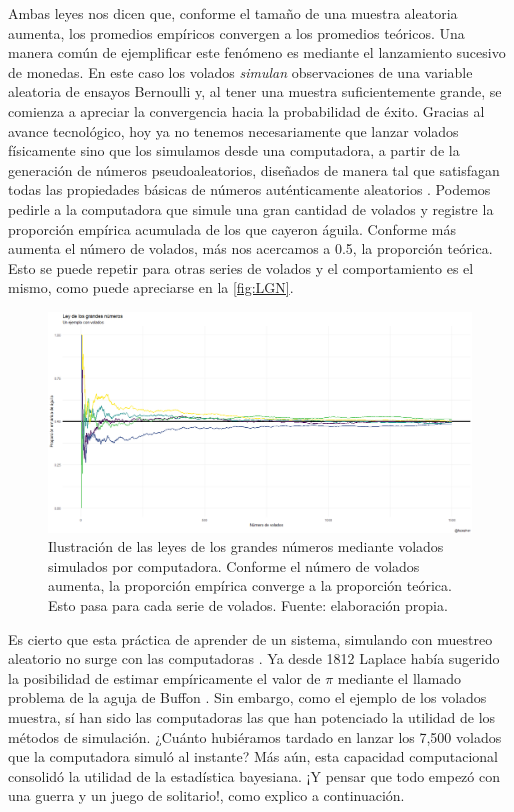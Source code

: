 Ambas leyes nos dicen que, conforme el tamaño de una muestra aleatoria aumenta, los promedios empíricos convergen a los promedios teóricos. Una manera común de ejemplificar este fenómeno es mediante el lanzamiento sucesivo de monedas. En este caso los volados \textit{simulan} observaciones de una variable aleatoria de ensayos Bernoulli y, al tener una muestra suficientemente grande, se comienza a apreciar la convergencia hacia la probabilidad de éxito. Gracias al avance tecnológico, hoy ya no tenemos necesariamente que lanzar volados físicamente sino que los simulamos desde una computadora, a partir de la generación de números pseudoaleatorios, diseñados de manera tal que satisfagan todas las propiedades básicas de números auténticamente aleatorios \parencite{Ross13}. Podemos pedirle a la computadora que simule una gran cantidad de volados y registre la proporción empírica acumulada de los que cayeron águila. Conforme más aumenta el número de volados, más nos acercamos a 0.5, la proporción teórica. Esto se puede repetir para otras series de volados y el comportamiento es el mismo, como puede apreciarse en la \ref{fig:LGN}. \\

\begin{figure}[h]
	\centering
	\includegraphics[scale=0.25]{Figs/LGN}
	\caption{Ilustración de las leyes de los grandes números mediante volados simulados por computadora. Conforme el número de volados aumenta, la proporción empírica converge a la proporción teórica. Esto pasa para cada serie de volados. Fuente: elaboración propia.}
	\label{fig:Regimen_Semipresidencial_VRepFr}	
\end{figure}

Es cierto que esta práctica de aprender de un sistema, simulando con muestreo aleatorio no surge con las computadoras \parencite{Owen13}. Ya desde 1812 Laplace había sugerido la posibilidad de estimar empíricamente el valor de $\pi$ mediante el llamado problema de la aguja de Buffon \parencite{Ragheb13}. Sin embargo, como el ejemplo de los volados muestra, sí han sido las computadoras las que han potenciado la utilidad de los métodos de simulación. ¿Cuánto hubiéramos tardado en lanzar los 7,500 volados que la computadora simuló al instante? Más aún, esta capacidad computacional consolidó la utilidad de la estadística bayesiana. ¡Y pensar que todo empezó con una guerra y un juego de solitario!, como explico a continuación.

